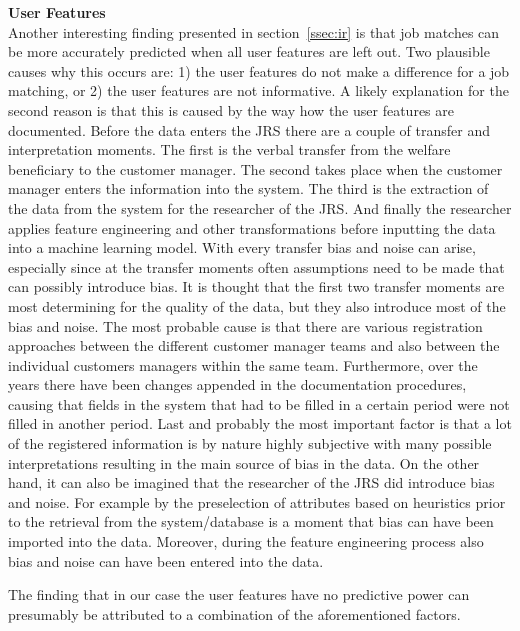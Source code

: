\noindent
\textbf{User Features}\\
Another interesting finding presented in section~\ref{ssec:ir} is that job matches can be more accurately predicted when all user features are left out.  
Two plausible causes why this occurs are: 1) the user features do not make a difference for a job matching, or 2) the user features are not informative.
A likely explanation for the second reason is that this is caused by the way how the user features are documented.
Before the data enters the JRS there are a couple of transfer and interpretation moments. 
The first is the verbal transfer from the welfare beneficiary to the customer manager.
The second takes place when the customer manager enters the information into the system.
The third is the extraction of the data from the system for the researcher of the JRS.
And finally the researcher applies feature engineering and other transformations before inputting the data into a machine learning model.
With every transfer bias and noise can arise, especially since at the transfer moments often assumptions need to be made that can possibly introduce bias.
It is thought that the first two transfer moments are most determining for the quality of the data, but they also introduce most of the bias and noise. The most probable cause is that there are various registration approaches between the different customer manager teams and also between the individual customers managers within the same team. 
Furthermore, over the years there have been changes appended in the documentation procedures, causing that fields in the system that had to be filled in a certain period were not filled  in another period.
Last and probably the most important factor is that a lot of the registered information is by nature highly subjective with many possible interpretations resulting in the main source of bias in the data. 
On the other hand, it can also be imagined that the researcher of the JRS did introduce bias and noise.
For example by the preselection of attributes based on heuristics prior to the retrieval from the system/database is a moment that bias can have been imported into the data.
Moreover, during the feature engineering process also bias and noise can have been entered into the data.

The finding that in our case the user features have no predictive power can presumably be attributed to a combination of the aforementioned factors. 

